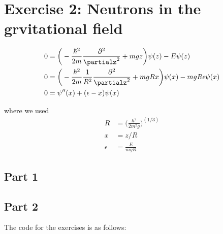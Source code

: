 \documentclass[12pt,a4paper,twoside]{article}
\begin{document}
\section*{Exercise 2: Neutrons in the grvitational field}

\begin{align*}
  0 &= \bigg(-\frac{\hbar^2}{2m} \frac{\partial^2}{\partialz^2} + mgz \bigg)
            \psi(z) - E \psi(z)  \\     
  0 &= \bigg(-\frac{\hbar^2}{2m} \frac{1}{R^2} \frac{\partial^2}{\partialz^2} + mgRx \bigg)
            \psi(x) - mgR\epsilon \psi(x)  \\       
  0 &= \psi''(x) + (\epsilon - x) \psi(x)  
\end{align*}

where we used
\begin{align*}
  R &= \bigg( \frac{\hbar^2}{2m^2g} \bigg) ^(1/3)  \\
  x &= z/R  \\
  \epsilon &= \frac{E}{mgR}  
\end{align*}


\subsection*{Part 1}




\subsection*{Part 2}


%
The code for the exercises is as follows:

\end{document}
